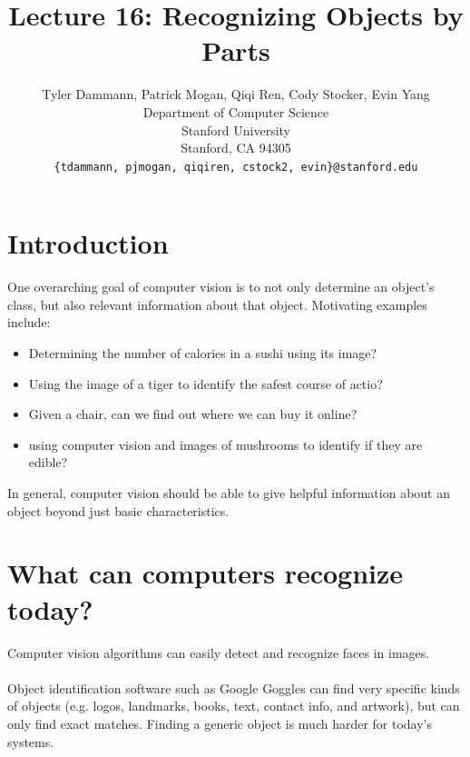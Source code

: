 \documentclass[11pt]{article}
\title{Lecture 16: Recognizing Objects by Parts}
\author{
  Tyler Dammann, Patrick Mogan, Qiqi Ren, Cody Stocker, Evin Yang \\
  Department of Computer Science\\
  Stanford University\\
  Stanford, CA 94305 \\
  \texttt{\{tdammann, pjmogan, qiqiren, cstock2, evin\}@stanford.edu} \\
}
\begin{document}
\maketitle
\section{Introduction}
One overarching goal of computer vision is to not only determine an object's class, but also relevant information about that object. Motivating examples include:
 \begin{itemize}
   \item Determining the number of calories in a sushi using its image?
   \item Using the image of a tiger to identify the safest course of actio?
   \item Given a chair, can we find out where we can buy it online?
   \item using computer vision and images of mushrooms to identify if they are edible?
 \end{itemize}
In general, computer vision should be able to give helpful information about an object beyond just basic characteristics.
\section{What can computers recognize today?}
Computer vision algorithms can easily detect and recognize faces in images.\\ \\
Object identification software such as Google Goggles can find very specific kinds of objects (e.g. logos, landmarks, books, text, contact info, and artwork), but can only find exact matches. Finding a generic object is much harder for today's systems.
\end{document}
